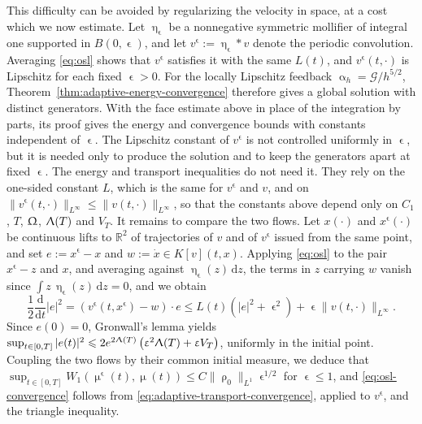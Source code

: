 \documentclass[letterpaper,11pt,twoside]{article}
\numberwithin{figure}{section}
\numberwithin{table}{section}
\theoremstyle{cpamplain}
\theoremstyle{cpamdefinition}
\newcommand{\R}{\mathbb{R}}
\newcommand{\diff}{\mathrm{d}}
\let\alpha\upalpha
\let\varepsilon\upvarepsilon
\let\eta\upeta
\let\mu\upmu
\let\rho\uprho
\let\Lambda\Uplambda
\let\Omega\Upomega
\renewcommand{\le}{\leqslant}
\numberwithin{equation}{section}
\begin{document}
This difficulty can be avoided by regularizing the velocity in space, at a cost which we now estimate.
Let $\eta_\varepsilon$ be a nonnegative symmetric mollifier of integral one supported in $B(0,\varepsilon)$, and let $v^\varepsilon:=\eta_\varepsilon*v$ denote the periodic convolution.
Averaging \eqref{eq:osl} shows that $v^\varepsilon$ satisfies it with the same $L(t)$, and $v^\varepsilon(t,\cdot)$ is Lipschitz for each fixed $\varepsilon>0$.
For the locally Lipschitz feedback $\alpha_h=\mathscr G/h^{5/2}$, Theorem~\ref{thm:adaptive-energy-convergence} therefore gives a global solution with distinct generators.
With the face estimate above in place of the integration by parts, its proof gives the energy and convergence bounds with constants independent of $\varepsilon$.
The Lipschitz constant of $v^\varepsilon$ is not controlled uniformly in $\varepsilon$, but it is needed only to produce the solution and to keep the generators apart at fixed $\varepsilon$.
The energy and transport inequalities do not need it. They rely on the one-sided constant $L$, which is the same for $v^\varepsilon$ and $v$, and on $\|v^\varepsilon(t,\cdot)\|_{L^\infty}\le\|v(t,\cdot)\|_{L^\infty}$, so that the constants above depend only on $C_1$, $T$, $\Omega$, $\Lambda(T)$ and $V_T$.
It remains to compare the two flows.
Let $x(\cdot)$ and $x^\varepsilon(\cdot)$ be continuous lifts to $\R^2$ of trajectories of $v$ and of $v^\varepsilon$ issued from the same point, and set $e:=x^\varepsilon-x$ and $w:=\dot x\in K[v](t,x)$.
Applying \eqref{eq:osl} to the pair $x^\varepsilon-z$ and $x$, and averaging against $\eta_\varepsilon(z)\,\diff z$, the terms in $z$ carrying $w$ vanish since $\int z\,\eta_\varepsilon(z)\,\diff z=0$, and we obtain
\[
\frac12\frac{\diff}{\diff t}|e|^2=\left(v^\varepsilon(t,x^\varepsilon)-w\right)\cdot e
\le L(t)\left(|e|^2+\varepsilon^2\right)+\varepsilon\|v(t,\cdot)\|_{L^\infty} .
\]
Since $e(0)=0$, Gronwall's lemma yields $\sup_{t\in[0,T]}|e(t)|^2\le 2e^{2\Lambda(T)}\left(\varepsilon^2\Lambda(T)+\varepsilon V_T\right)$, uniformly in the initial point.
Coupling the two flows by their common initial measure, we deduce that $\sup_{t\in[0,T]}W_1(\mu^\varepsilon(t),\mu(t))\le C\|\rho_0\|_{L^1}\varepsilon^{1/2}$ for $\varepsilon\le1$, and \eqref{eq:osl-convergence} follows from \eqref{eq:adaptive-transport-convergence}, applied to $v^\varepsilon$, and the triangle inequality.



\end{document}
